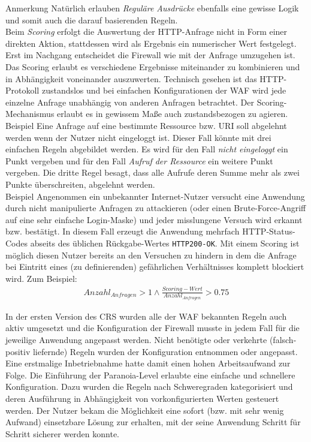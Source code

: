 \textcolor{bhtGray}{ Anmerkung} Natürlich erlauben \emph{Reguläre Ausdrücke} ebenfalls eine gewisse Logik und somit auch die darauf basierenden Regeln.\\

Beim \emph{Scoring} erfolgt die Auswertung der HTTP-Anfrage nicht in Form einer direkten Aktion, stattdessen wird als Ergebnis ein numerischer Wert festgelegt. Erst im Nachgang entscheidet die Firewall wie mit der Anfrage umzugehen ist. Das Scoring erlaubt es verschiedene Ergebnisse miteinander zu kombinieren und in Abhängigkeit voneinander auszuwerten. Technisch gesehen ist das HTTP-Protokoll zustandslos und bei einfachen Konfigurationen der WAF  wird jede einzelne Anfrage unabhängig von anderen Anfragen betrachtet. Der Scoring-Mechanismus erlaubt es in gewissem Maße auch zustandsbezogen zu agieren.\\

\textcolor{bhtGray}{ Beispiel} Eine Anfrage auf eine bestimmte Ressource bzw. URI soll abgelehnt werden wenn der Nutzer nicht eingeloggt ist. Dieser Fall könnte mit drei einfachen Regeln abgebildet werden. Es wird für den Fall \emph{nicht eingeloggt} ein Punkt vergeben und für den Fall \emph{Aufruf der Ressource} ein weitere Punkt vergeben. Die dritte Regel besagt, dass alle Aufrufe deren Summe mehr als zwei Punkte überschreiten, abgelehnt werden.\\

\textcolor{bhtGray}{ Beispiel} Angenommen ein unbekannter Internet-Nutzer versucht eine Anwendung durch nicht manipulierte Anfragen zu attackieren (oder einen Brute-Force-Angriff auf eine sehr einfache Login-Maske) und jeder misslungene Versuch wird erkannt bzw. bestätigt. In diesem Fall erzeugt die Anwendung mehrfach HTTP-Status-Codes abseits des üblichen Rückgabe-Wertes \verb=HTTP200-OK=. Mit einem Scoring ist möglich diesen Nutzer bereits an den Versuchen zu hindern in dem die Anfrage bei Eintritt eines (zu definierenden) gefährlichen Verhältnisses komplett blockiert wird. Zum Beispiel: 
\begin{align}
  Anzahl_{Anfragen} > 1 \land \frac{Scoring-Wert}{Anzahl_{Anfragen}} > 0.75
\end{align}

In der ersten Version des CRS wurden alle der WAF bekannten Regeln auch aktiv umgesetzt und die Konfiguration der Firewall musste in jedem Fall für die jeweilige Anwendung angepasst werden. Nicht benötigte oder verkehrte (falsch-positiv liefernde) Regeln wurden der Konfiguration entnommen oder angepasst. Eine erstmalige Inbetriebnahme hatte damit einen hohen Arbeitsaufwand zur Folge. Die Einführung der Paranoia-Level erlaubte eine einfache und schnellere Konfiguration. Dazu wurden die Regeln nach Schweregraden kategorisiert und deren Ausführung in Abhängigkeit von vorkonfigurierten Werten gesteuert werden. Der Nutzer bekam die Möglichkeit eine sofort (bzw. mit sehr wenig Aufwand) einsetzbare Lösung zur erhalten, mit der seine Anwendung Schritt für Schritt sicherer werden konnte.

